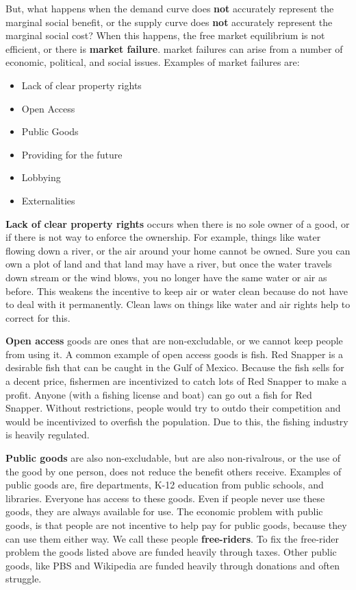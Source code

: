 \documentclass[
]{book}
\providecommand{\tightlist}{%
  \setlength{\itemsep}{0pt}\setlength{\parskip}{0pt}}
\begin{document}
But, what happens when the demand curve does \textbf{not }accurately represent the marginal social benefit, or the supply curve does \textbf{not }accurately represent the marginal social cost? When this happens, the free market equilibrium is not efficient, or there is \textbf{market failure}. market failures can arise from a number of economic, political, and social issues. Examples of market failures are:

\begin{itemize}
\tightlist
\item
  Lack of clear property rights
\item
  Open Access
\item
  Public Goods
\item
  Providing for the future
\item
  Lobbying
\item
  Externalities
\end{itemize}

\textbf{Lack of clear property rights} occurs when there is no sole owner of a good, or if there is not way to enforce the ownership. For example, things like water flowing down a river, or the air around your home cannot be owned. Sure you can own a plot of land and that land may have a river, but once the water travels down stream or the wind blows, you no longer have the same water or air as before. This weakens the incentive to keep air or water clean because do not have to deal with it permanently. Clean laws on things like water and air rights help to correct for this.

\textbf{Open access} goods are ones that are non-excludable, or we cannot keep people from using it. A common example of open access goods is fish. Red Snapper is a desirable fish that can be caught in the Gulf of Mexico. Because the fish sells for a decent price, fishermen are incentivized to catch lots of Red Snapper to make a profit. Anyone (with a fishing license and boat) can go out a fish for Red Snapper. Without restrictions, people would try to outdo their competition and would be incentivized to overfish the population. Due to this, the fishing industry is heavily regulated.

\textbf{Public goods} are also non-excludable, but are also non-rivalrous, or the use of the good by one person, does not reduce the benefit others receive. Examples of public goods are, fire departments, K-12 education from public schools, and libraries. Everyone has access to these goods. Even if people never use these goods, they are always available for use. The economic problem with public goods, is that people are not incentive to help pay for public goods, because they can use them either way. We call these people \textbf{free-riders}. To fix the free-rider problem the goods listed above are funded heavily through taxes. Other public goods, like PBS and Wikipedia are funded heavily through donations and often struggle.
\end{document}
